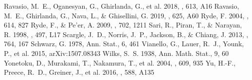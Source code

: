 \documentclass[twocolumn]{aastex631}
\begin{document}
\begin{thebibliography}{}
 Ravasio, M.~E., Oganesyan, G., Ghirlanda, G., et al. 2018, \aap, 613, A16
 Ravasio, M.~E., Ghirlanda, G., Nava, L., \& Ghisellini, G. 2019, \aap, 625, A60
 Ryde, F. 2004, \apj, 614, 827
 Ryde, F., \& Pe'er, A. 2009, \apj, 702, 1211
 Sari, R., Piran, T., \& Narayan, R. 1998, \apjl, 497, L17
 Scargle, J.~D., Norris, J.~P., Jackson, B., \& Chiang, J. 2013, \apj, 764, 167
 Schwarz, G. 1978, Ann. Stat., 6, 461
 Vianello, G., Lauer, R.~J., Younk, P., et al. 2015, arXiv:1507.08343
 Wilks, S.~S. 1938, Ann. Math. Stat., 9, 60
 Yonetoku, D., Murakami, T., Nakamura, T., et al. 2004, \apj, 609, 935
 Yu, H.-F., Preece, R.~D., Greiner, J., et al. 2016, \aap, 588, A135
\end{thebibliography}
\end{document}
